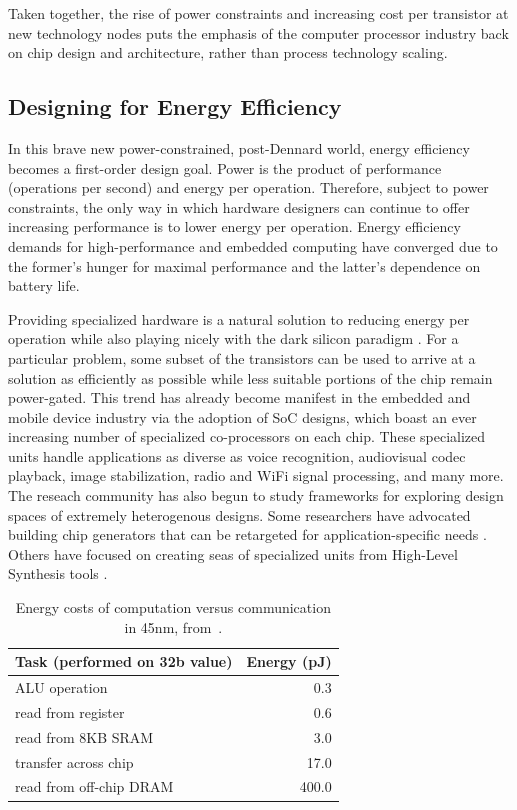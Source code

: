 Taken together, the rise of power constraints and increasing cost per transistor at new technology nodes
puts the emphasis of the computer processor industry back on chip design and architecture, rather than process technology scaling.

\subsection{Designing for Energy Efficiency}

In this brave new power-constrained, post-Dennard world, energy efficiency becomes a first-order design goal.
Power is the product of performance (operations per second) and energy per operation.
Therefore, subject to power constraints, the only way in which hardware designers can continue to offer increasing performance is to lower energy per operation.
Energy efficiency demands for high-performance and embedded computing have converged due to the former's hunger for maximal performance and the latter's dependence on battery life.

Providing specialized hardware is a natural solution to reducing energy per operation while also playing nicely with the dark silicon paradigm \cite{esmaeilzadeh2011dark}.
For a particular problem, some subset of the transistors can be used to arrive at a solution as efficiently as possible while less suitable portions of the chip remain power-gated.
This trend has already become manifest in the embedded and mobile device industry via the adoption of SoC designs, which boast an ever increasing number of specialized co-processors on each chip.
These specialized units handle applications as diverse as voice recognition, audiovisual codec playback, image stabilization, radio and WiFi signal processing, and many more.
The reseach community has also begun to study frameworks for exploring design spaces of extremely heterogenous designs.
Some researchers have advocated building chip generators that can be retargeted for application-specific needs \cite{shacham-micro10}.
Others have focused on creating seas of specialized units from High-Level Synthesis tools \cite{shao2014aladdin, Venkatesh:2010}.

\begin{table}[tdp]
\begin{center}
\begin{tabular}{|l|r|} 
\hline
Task (performed on 32b value) & Energy (pJ) \\ \hline
ALU operation & 0.3 \\ \hline
read from register & 0.6 \\ \hline
read from 8KB SRAM & 3.0 \\ \hline
transfer across chip & 17.0 \\ \hline
read from off-chip DRAM & 400.0 \\ \hline
\end{tabular}
\end{center}
\caption[Energy costs of computation versus communication in 45nm.]{
Energy costs of computation versus communication in 45nm, from~\cite{dally-hpca02}. }
\label{tab:movement}
\end{table}

